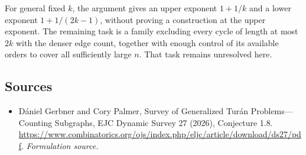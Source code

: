 \documentclass[11pt]{article}
\begin{document}
For general fixed $k$, the argument gives an upper exponent $1+1/k$ and a lower exponent $1+1/(2k-1)$, without proving a construction at the upper exponent. The remaining task is a family excluding every cycle of length at most $2k$ with the denser edge count, together with enough control of its available orders to cover all sufficiently large $n$. That task remains unresolved here.

\subsection{Sources}
\begin{itemize}
\item[S1]Dániel Gerbner and Cory Palmer, Survey of Generalized Turán Problems—Counting Subgraphs, EJC Dynamic Survey 27 (2026), Conjecture 1.8.
\url{https://www.combinatorics.org/ojs/index.php/eljc/article/download/ds27/pdf}.
\textit{Formulation source.}
\end{itemize}
\end{document}
